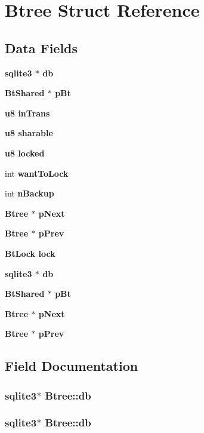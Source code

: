 \section{Btree Struct Reference}
\label{structBtree}
\subsection*{Data Fields}
\begin{CompactItemize}
\item 
\bf{sqlite3} $\ast$ \bf{db}
\item 
\bf{Bt\-Shared} $\ast$ \bf{p\-Bt}
\item 
\bf{u8} \bf{in\-Trans}
\item 
\bf{u8} \bf{sharable}
\item 
\bf{u8} \bf{locked}
\item 
int \bf{want\-To\-Lock}
\item 
int \bf{n\-Backup}
\item 
\bf{Btree} $\ast$ \bf{p\-Next}
\item 
\bf{Btree} $\ast$ \bf{p\-Prev}
\item 
\bf{Bt\-Lock} \bf{lock}
\item 
\bf{sqlite3} $\ast$ \bf{db}
\item 
\bf{Bt\-Shared} $\ast$ \bf{p\-Bt}
\item 
\bf{Btree} $\ast$ \bf{p\-Next}
\item 
\bf{Btree} $\ast$ \bf{p\-Prev}
\end{CompactItemize}


\subsection{Field Documentation}
\subsubsection{\setlength{\rightskip}{0pt plus 5cm}\bf{sqlite3}$\ast$ \bf{Btree::db}}\label{structBtree_42e1a9aa7ac0e4ffe59b99faad929532}


\subsubsection{\setlength{\rightskip}{0pt plus 5cm}\bf{sqlite3}$\ast$ \bf{Btree::db}}\label{structBtree_42e1a9aa7ac0e4ffe59b99faad929532}


